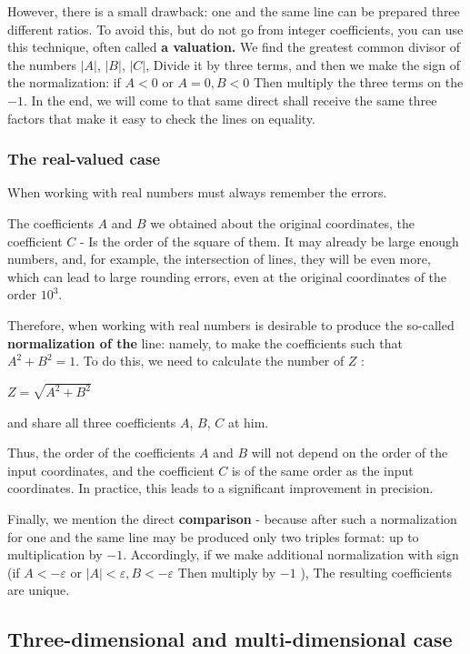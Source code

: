 However, there is a small drawback: one and the same line can be prepared three different ratios. To avoid this, but do not go from integer coefficients, you can use this technique, often called \textbf{a valuation.} We find the greatest common divisor of the numbers $| A |$, $| B |$, $| C |$, Divide it by three terms, and then we make the sign of the normalization: if $A <0$ or $A = 0, B <0$ Then multiply the three terms on the $-1$. In the end, we will come to that same direct shall receive the same three factors that make it easy to check the lines on equality.

\subsubsection{ The real-valued case }

When working with real numbers must always remember the errors.

The coefficients $A$ and $B$ we obtained about the original coordinates, the coefficient $C$ - Is the order of the square of them. It may already be large enough numbers, and, for example, the intersection of lines, they will be even more, which can lead to large rounding errors, even at the original coordinates of the order $10 ^ 3$.

Therefore, when working with real numbers is desirable to produce the so-called \textbf{normalization of the} line: namely, to make the coefficients such that $A ^ 2 + B ^ 2 = 1$. To do this, we need to calculate the number of $Z$ :

$Z = \sqrt {A ^ 2 + B ^ 2}$

and share all three coefficients $A$, $B$, $C$ at him.

Thus, the order of the coefficients $A$ and $B$ will not depend on the order of the input coordinates, and the coefficient $C$ is of the same order as the input coordinates. In practice, this leads to a significant improvement in precision.

Finally, we mention the direct \textbf{comparison} - because after such a normalization for one and the same line may be produced only two triples format: up to multiplication by $-1$. Accordingly, if we make additional normalization with sign (if $A <- \varepsilon$ or $| A | <\varepsilon, B <- \varepsilon$ Then multiply by $-1$ ), The resulting coefficients are unique.

\subsection{ Three-dimensional and multi-dimensional case }

